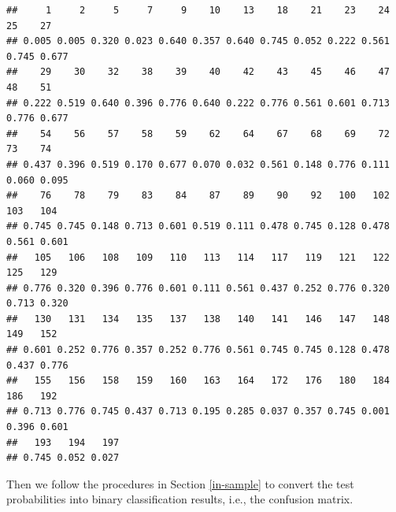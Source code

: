 \documentclass[
]{article}
\newenvironment{Shaded}{\begin{snugshade}}{\end{snugshade}}
\newcommand{\CommentTok}[1]{\textcolor[rgb]{0.56,0.35,0.01}{\textit{#1}}}
\newcommand{\DecValTok}[1]{\textcolor[rgb]{0.00,0.00,0.81}{#1}}
\newcommand{\FloatTok}[1]{\textcolor[rgb]{0.00,0.00,0.81}{#1}}
\newcommand{\FunctionTok}[1]{\textcolor[rgb]{0.00,0.00,0.00}{#1}}
\newcommand{\NormalTok}[1]{#1}
\newcommand{\OtherTok}[1]{\textcolor[rgb]{0.56,0.35,0.01}{#1}}
\newcommand{\SpecialCharTok}[1]{\textcolor[rgb]{0.00,0.00,0.00}{#1}}
\begin{document}
\begin{verbatim}
##     1     2     5     7     9    10    13    18    21    23    24    25    27 
## 0.005 0.005 0.320 0.023 0.640 0.357 0.640 0.745 0.052 0.222 0.561 0.745 0.677 
##    29    30    32    38    39    40    42    43    45    46    47    48    51 
## 0.222 0.519 0.640 0.396 0.776 0.640 0.222 0.776 0.561 0.601 0.713 0.776 0.677 
##    54    56    57    58    59    62    64    67    68    69    72    73    74 
## 0.437 0.396 0.519 0.170 0.677 0.070 0.032 0.561 0.148 0.776 0.111 0.060 0.095 
##    76    78    79    83    84    87    89    90    92   100   102   103   104 
## 0.745 0.745 0.148 0.713 0.601 0.519 0.111 0.478 0.745 0.128 0.478 0.561 0.601 
##   105   106   108   109   110   113   114   117   119   121   122   125   129 
## 0.776 0.320 0.396 0.776 0.601 0.111 0.561 0.437 0.252 0.776 0.320 0.713 0.320 
##   130   131   134   135   137   138   140   141   146   147   148   149   152 
## 0.601 0.252 0.776 0.357 0.252 0.776 0.561 0.745 0.745 0.128 0.478 0.437 0.776 
##   155   156   158   159   160   163   164   172   176   180   184   186   192 
## 0.713 0.776 0.745 0.437 0.713 0.195 0.285 0.037 0.357 0.745 0.001 0.396 0.601 
##   193   194   197 
## 0.745 0.052 0.027
\end{verbatim}

Then we follow the procedures in Section \ref{in-sample} to convert the
test probabilities into binary classification results, i.e., the
confusion matrix.

\begin{Shaded}
\end{Shaded}
\end{document}
